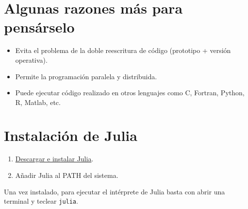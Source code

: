 \documentclass[
  letterpaper,
  DIV=11,
  numbers=noendperiod]{scrreprt}
\providecommand{\tightlist}{%
  \setlength{\itemsep}{0pt}\setlength{\parskip}{0pt}}\usepackage{longtable,booktabs,array}
\begin{document}
\hypertarget{algunas-razones-muxe1s-para-pensuxe1rselo}{%
\section{Algunas razones más para
pensárselo}\label{algunas-razones-muxe1s-para-pensuxe1rselo}}

\begin{itemize}
\tightlist
\item
  Evita el problema de la doble reescritura de código (prototipo +
  versión operativa).
\item
  Permite la programación paralela y distribuida.
\item
  Puede ejecutar código realizado en otros lenguajes como C, Fortran,
  Python, R, Matlab, etc.
\end{itemize}

\hypertarget{instalaciuxf3n-de-julia}{%
\section{Instalación de Julia}\label{instalaciuxf3n-de-julia}}

\begin{enumerate}
\def\labelenumi{\arabic{enumi}.}
\tightlist
\item
  \href{https://julialang.org/downloads/}{Descargar e instalar Julia}.
\item
  Añadir Julia al PATH del sistema.
\end{enumerate}

Una vez instalado, para ejecutar el intérprete de Julia basta con abrir
una terminal y teclear \texttt{julia}.
\end{document}
